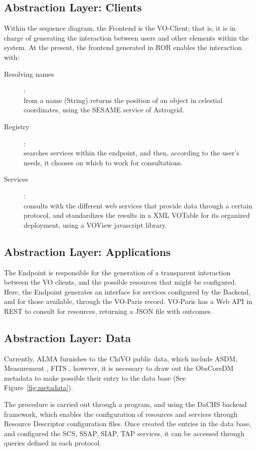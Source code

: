 \documentclass[]{spie}
\begin{document}
\subsection{Abstraction Layer:  Clients}
Within the sequence diagram, the Frontend is the VO-Client; that is, it is in
charge of generating the interaction between users and other elements within
the system.
At the present, the frontend generated in ROR enables the interaction with:
\begin{description}
    \item[Resolving names]:\hfill \\
        from a name (String) returns the position of an object in celestial
        coordinates, using the SESAME service of Astrogrid.
    \item[Registry]: \hfill \\
        searches services within the endpoint, and then, according to the
        user's needs, it chooses on which to work for consultations.
    \item[Services]: \hfill \\
        consults with the different web services that provide data through a
        certain protocol, and standardizes the results in a XML VOTable for its
        organized deployment, using a VOView javascript library.
\end{description}

\subsection{Abstraction Layer:  Applications}
The Endpoint is responsible for the generation of a transparent interaction
between the VO clients, and the possible resources that might be configured.
Here, the Endpoint generates an interface for services configured by the
Backend, and for those available, through the VO-Paris record.  VO-Paris has a
Web API in REST to consult for resources, returning a JSON file with outcomes.

\subsection{Abstraction Layer:  Data}
Currently, ALMA furnishes to the ChiVO public data, which include ASDM,
Measurement \cite{petry2012analysing}, FITS \cite{wells1981fits}, however, it
is necessary to draw out the ObsCoreDM metadata to make possible their entry to
the data base (See Figure~\ref{fig:metadata}).

The procedure is carried out through a program, and using the DaCHS backend
framework, which enables the configuration of resources and services through
Resource Descriptor  configuration files.  Once created the entries in the data
base, and configured the SCS, SSAP, SIAP, TAP services, it can be accessed
through queries defined in each protocol.
\end{document}
